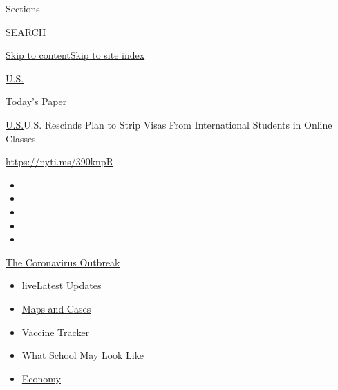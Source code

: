 Sections

SEARCH

\protect\hyperlink{site-content}{Skip to
content}\protect\hyperlink{site-index}{Skip to site index}

\href{https://www.nytimes.com/section/us}{U.S.}

\href{https://myaccount.nytimes.com/auth/login?response_type=cookie\&client_id=vi}{}

\href{https://www.nytimes.com/section/todayspaper}{Today's Paper}

\href{/section/us}{U.S.}\textbar{}U.S. Rescinds Plan to Strip Visas From
International Students in Online Classes

\url{https://nyti.ms/390knpR}

\begin{itemize}
\item
\item
\item
\item
\item
\end{itemize}

\href{https://www.nytimes.com/news-event/coronavirus?action=click\&pgtype=Article\&state=default\&region=TOP_BANNER\&context=storylines_menu}{The
Coronavirus Outbreak}

\begin{itemize}
\tightlist
\item
  live\href{https://www.nytimes.com/2020/08/02/world/coronavirus-updates.html?action=click\&pgtype=Article\&state=default\&region=TOP_BANNER\&context=storylines_menu}{Latest
  Updates}
\item
  \href{https://www.nytimes.com/interactive/2020/us/coronavirus-us-cases.html?action=click\&pgtype=Article\&state=default\&region=TOP_BANNER\&context=storylines_menu}{Maps
  and Cases}
\item
  \href{https://www.nytimes.com/interactive/2020/science/coronavirus-vaccine-tracker.html?action=click\&pgtype=Article\&state=default\&region=TOP_BANNER\&context=storylines_menu}{Vaccine
  Tracker}
\item
  \href{https://www.nytimes.com/interactive/2020/07/29/us/schools-reopening-coronavirus.html?action=click\&pgtype=Article\&state=default\&region=TOP_BANNER\&context=storylines_menu}{What
  School May Look Like}
\item
  \href{https://www.nytimes.com/live/2020/07/31/business/stock-market-today-coronavirus?action=click\&pgtype=Article\&state=default\&region=TOP_BANNER\&context=storylines_menu}{Economy}
\end{itemize}

